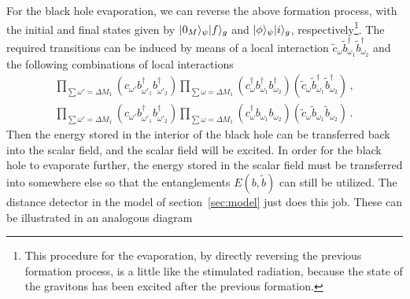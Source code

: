 \documentclass[12pt,a4paper]{article}
\begin{document}
For the black hole evaporation, we can reverse the above
formation process, with the initial and final states given by
$\arrowvert0_M\rangle_{\psi}\arrowvert f\rangle_g$ and $\arrowvert\phi\rangle_{\psi}\arrowvert i\rangle_g$, respectively\footnote{This procedure for the evaporation, by directly reversing the previous formation process, is a little like the stimulated radiation, because the state of the gravitons has been excited after the previous formation. }. The required
transitions can be induced by means of a local interaction
$\tilde{c}_{\omega}\tilde{b}_{\omega_1}^{\dag}\tilde{b}_{\omega_2}^{\dag}$
and the following combinations of local interactions
\begin{subequations}\label{eq:79}
\begin{align}
\label{eq:79:1} \prod_{\sum\omega'=\Delta
M_1}(c_{\omega'}b_{\omega'_1}^{\dag}b_{\omega'_2}^{\dag})\prod_{\sum\omega=\Delta
M_1}(c_{\omega}^{\dag}b_{\omega_1}^{\dag}b_{\omega_2}^{\dag})(\tilde{c}_{\omega}\tilde{b}_{\omega_1}^{\dag}\tilde{b}_{\omega_2}^{\dag})\,,
\\
\label{eq:79:2} \prod_{\sum\omega'=\Delta
M_1}(c_{\omega'}b_{\omega'_1}^{\dag}b_{\omega'_2}^{\dag})\prod_{\sum\omega=\Delta
M_1}(c_{\omega}^{\dag}b_{\omega_1}b_{\omega_2})(\tilde{c}_{\omega}\tilde{b}_{\omega_1}\tilde{b}_{\omega_2})\,.
\end{align}
\end{subequations}
Then the energy stored in
the interior of the black hole can be transferred back into the scalar field, and the scalar field will be excited. In
order for the black hole to evaporate further, the energy stored in
the scalar field must be transferred into somewhere else so that the
entanglements $E(b,\tilde{b})$ can still be utilized. The distance
detector in the model of section~\ref{sec:model} just does this job. These can be
illustrated in an analogous diagram
\end{document}
